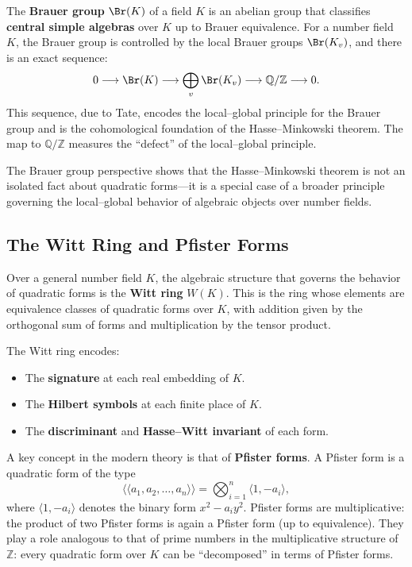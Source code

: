 The \textbf{Brauer group} $\Br(K)$ of a field $K$ is an abelian group that classifies \textbf{central simple algebras} over $K$ up to Brauer equivalence. For a number field $K$, the Brauer group is controlled by the local Brauer groups $\Br(K_v)$, and there is an exact sequence:
\[
    0 \longrightarrow \Br(K) \longrightarrow \bigoplus_v \Br(K_v) \longrightarrow \mathbb{Q}/\mathbb{Z} \longrightarrow 0.
\]
This sequence, due to Tate, encodes the local--global principle for the Brauer group and is the cohomological foundation of the Hasse--Minkowski theorem. The map to $\mathbb{Q}/\mathbb{Z}$ measures the ``defect'' of the local--global principle.

The Brauer group perspective shows that the Hasse--Minkowski theorem is not an isolated fact about quadratic forms---it is a special case of a broader principle governing the local--global behavior of algebraic objects over number fields.

\subsection{The Witt Ring and Pfister Forms}

Over a general number field $K$, the algebraic structure that governs the behavior of quadratic forms is the \textbf{Witt ring} $W(K)$. This is the ring whose elements are equivalence classes of quadratic forms over $K$, with addition given by the orthogonal sum of forms and multiplication by the tensor product.

The Witt ring encodes:
\begin{itemize}
    \item The \textbf{signature} at each real embedding of $K$.
    \item The \textbf{Hilbert symbols} at each finite place of $K$.
    \item The \textbf{discriminant} and \textbf{Hasse--Witt invariant} of each form.
\end{itemize}

A key concept in the modern theory is that of \textbf{Pfister forms}. A Pfister form is a quadratic form of the type
\[
    \langle\langle a_1, a_2, \ldots, a_n \rangle\rangle = \bigotimes_{i=1}^n \langle 1, -a_i \rangle,
\]
where $\langle 1, -a_i \rangle$ denotes the binary form $x^2 - a_i y^2$. Pfister forms are multiplicative: the product of two Pfister forms is again a Pfister form (up to equivalence). They play a role analogous to that of prime numbers in the multiplicative structure of $\mathbb{Z}$: every quadratic form over $K$ can be ``decomposed'' in terms of Pfister forms.

